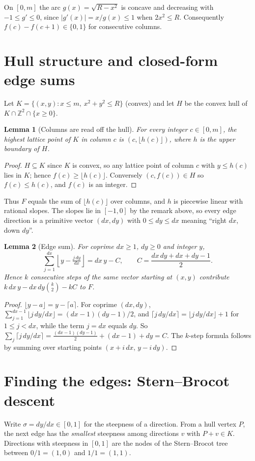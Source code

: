 \documentclass[11pt]{article}
\newtheorem{lemma}{Lemma}
\theoremstyle{remark}
\newcommand{\Z}{\mathbb{Z}}
\begin{document}
On $[0,m]$ the arc $g(x)=\sqrt{R-x^2}$ is concave and decreasing with $-1\le g'\le 0$, since $|g'(x)|=x/g(x)\le 1$ when $2x^2\le R$. Consequently $f(c)-f(c+1)\in\{0,1\}$ for consecutive columns.

\section{Hull structure and closed-form edge sums}
Let $K=\{(x,y): x\le m,\ x^2+y^2\le R\}$ (convex) and let $H$ be the convex hull of $K\cap\Z^2\cap\{x\ge0\}$.

\begin{lemma}[Columns are read off the hull]\label{lem:hull}
For every integer $c\in[0,m]$, the highest lattice point of $K$ in column $c$ is $(c,\lfloor h(c)\rfloor)$, where $h$ is the upper boundary of $H$.
\end{lemma}
\begin{proof}
$H\subseteq K$ since $K$ is convex, so any lattice point of column $c$ with $y\le h(c)$ lies in $K$; hence $f(c)\ge\lfloor h(c)\rfloor$. Conversely $(c,f(c))\in H$ so $f(c)\le h(c)$, and $f(c)$ is an integer.
\end{proof}

Thus $F$ equals the sum of $\lfloor h(c)\rfloor$ over columns, and $h$ is piecewise linear with rational slopes. The slopes lie in $[-1,0]$ by the remark above, so every edge direction is a primitive vector $(dx,dy)$ with $0\le dy\le dx$ meaning ``right $dx$, down $dy$''.

\begin{lemma}[Edge sum]\label{lem:edge}
For coprime $dx\ge1$, $dy\ge0$ and integer $y$,
\[
\sum_{j=1}^{dx}\left\lfloor y-\tfrac{j\,dy}{dx}\right\rfloor
= dx\,y-C,\qquad C=\frac{dx\,dy+dx+dy-1}{2}.
\]
Hence $k$ consecutive steps of the same vector starting at $(x,y)$ contribute
$k\,dx\,y-dx\,dy\binom{k}{2}-kC$ to $F$.
\end{lemma}
\begin{proof}
$\lfloor y-a\rfloor=y-\lceil a\rceil$. For coprime $(dx,dy)$, $\sum_{j=1}^{dx-1}\lfloor j\,dy/dx\rfloor=(dx-1)(dy-1)/2$, and $\lceil j\,dy/dx\rceil=\lfloor j\,dy/dx\rfloor+1$ for $1\le j<dx$, while the term $j=dx$ equals $dy$. So $\sum_j\lceil j\,dy/dx\rceil=\tfrac{(dx-1)(dy-1)}2+(dx-1)+dy=C$. The $k$-step formula follows by summing over starting points $(x+i\,dx,\,y-i\,dy)$.
\end{proof}

\section{Finding the edges: Stern--Brocot descent}
Write $\sigma=dy/dx\in[0,1]$ for the steepness of a direction. From a hull vertex $P$, the next edge has the \emph{smallest} steepness among directions $v$ with $P+v\in K$. Directions with steepness in $[0,1]$ are the nodes of the Stern--Brocot tree between $0/1=(1,0)$ and $1/1=(1,1)$.
\end{document}
